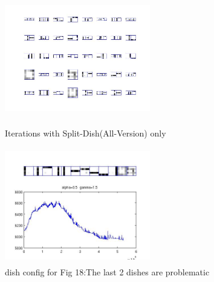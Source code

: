 \documentclass{article}
\begin{document}
\begin{spacing}{1.1}
\begin{figure}[h] 
  \begin{minipage}[b]{0.5\textwidth} 
    \centering 
    \includegraphics[width=2.5in,height=2in]{init1_5_nmt85_allll.jpg} 
    \caption{Iterations with Split-Dish(All-Version) only}
    \label{fig:by:table} 
  \end{minipage}%
  \begin{minipage}[b]{0.5\textwidth} 
    \centering 
    \includegraphics[width=2.5in,height=2in]{init1_5_nmt85_allll_d.jpg} 
    \caption{dish config for Fig 18:The last 2 dishes are problematic}
    \label{fig:by:table}  
   \end{minipage}%
\end{figure}


\end{spacing}
\end{document}
